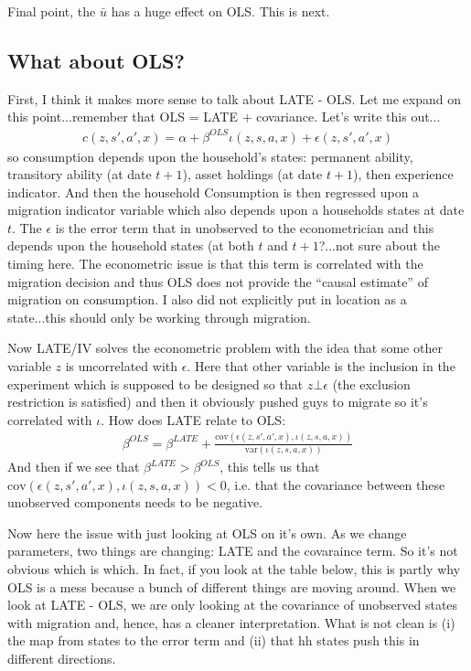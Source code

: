 \documentclass[pdftex,11pt]{article}
\begin{document}
Final point, the $\bar u$ has a huge effect on OLS. This is next.

\subsection{What about OLS?}

First, I think it makes more sense to talk about LATE - OLS. Let me expand on this point...remember that OLS = LATE + covariance. Let's write this out...
\begin{align}
c(z,s',a',x) = \alpha + \beta^{OLS} \iota(z,s,a,x) + \epsilon(z,s',a',x)
\end{align}
so consumption depends upon the household's states: permanent ability, transitory ability (at date $t+1$), asset holdings (at date $t+1$), then experience indicator. And then the household Consumption is then regressed upon a migration indicator variable which also depends upon a households states at date $t$.  The $\epsilon$ is the error term that in unobserved to the econometrician and this depends upon the household states (at both $t$ and $t+1$?...not sure about the timing here. The econometric issue is that this term is correlated with the migration decision and thus OLS does not provide the ``causal estimate'' of migration on consumption. I also did not explicitly put in location as a state...this should only be working through migration. 

Now LATE/IV solves the econometric problem with the idea that some other variable $z$ is uncorrelated with $\epsilon$. Here that other variable is the inclusion in the experiment which is supposed to be designed so that $z \bot  \epsilon$ (the exclusion restriction is satisfied) and then it obviously pushed guys to migrate so it's correlated with $\iota$. How does LATE relate to OLS:
\begin{align}
\beta^{OLS} = \beta^{LATE} + \frac{\mathrm{cov}( \epsilon(z,s',a',x), \iota(z,s,a,x))} {\mathrm{var}(\iota(z,s,a,x))}
\end{align}
And then if we see that $\beta^{LATE} > \beta^{OLS}$, this tells us that $\mathrm{cov}( \epsilon(z,s',a',x), \iota(z,s,a,x)) < 0$, i.e. that the covariance between these unobserved components needs to be negative. 

Now here the issue with just looking at OLS on it's own. As we change parameters, two things are changing: LATE and the covaraince term. So it's not obvious which is which. In fact, if you look at the table below, this is partly why OLS is a mess because a bunch of different things are moving around. When we look at LATE - OLS, we are only looking at the covariance of unobserved states with migration and, hence, has a cleaner interpretation. What is not clean is (i) the map from states to the error term and (ii) that hh states push this in different directions.
\end{document}
